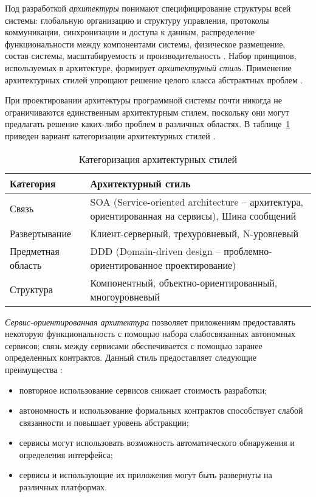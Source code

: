 Под разработкой \emph{архитектуры} понимают специфицирование структуры всей системы: глобальную организацию и структуру
управления, протоколы коммуникации, синхронизации и доступа к данным, распределение функциональности между компонентами
системы, физическое размещение, состав системы, масштабируемость и производительность \cite{introduction_to_architecture}.
Набор принципов, используемых в архитектуре, формирует \emph{архитектурный стиль}. Применение архитектурных стилей
упрощают решение целого класса абстрактных проблем \cite{architecture_volosevich}.

При проектировании архитектуры программной системы почти никогда не ограничиваются единственным архитектурным стилем,
поскольку они могут предлагать решение каких-либо проблем в различных областях.
В таблице~\ref{table:analysis:architectures:categorization} приведен вариант категоризации архитектурных
стилей \cite{application_architecture_guide}.

\begin{table}[ht]
  \caption{Категоризация архитектурных стилей}
  \label{table:analysis:architectures:categorization}
  \centering
  \begin{tabular}{|>{\raggedright}m{} 
                  |>{\raggedright\arraybackslash}m{}|}
    \hline Категория & Архитектурный стиль\\
    \hline Связь & SOA (Service-oriented architecture -- архитектура, ориентированная на сервисы), Шина сообщений\\
    \hline Развертывание & Клиент-серверный, трехуровневый, N-уровневый\\
    \hline Предметная область & DDD (Domain-driven design -- проблемно-ориентированное проектирование)\\
    \hline Структура & Компонентный, объектно-ориентированный, многоуровневый\\
    \hline
  \end{tabular}
\end{table}

\emph{Сервис-ориентированная архитектура} позволяет приложениям предоставлять некоторую функциональность с помощью
набора слабосвязанных автономных сервисов; связь между сервисами обеспечивается с помощью заранее определенных
контрактов. Данный стиль предоставляет следующие преимущества \cite{application_architecture_guide}:

\begin{itemize}
	\item повторное использование сервисов снижает стоимость разработки;
	\item автономность и использование формальных контрактов способствует слабой связанности и повышает уровень абстракции;
	\item сервисы могут использовать возможность автоматического обнаружения и определения интерфейса;
	\item сервисы и использующие их приложения могут быть развернуты на различных платформах.
\end{itemize}

